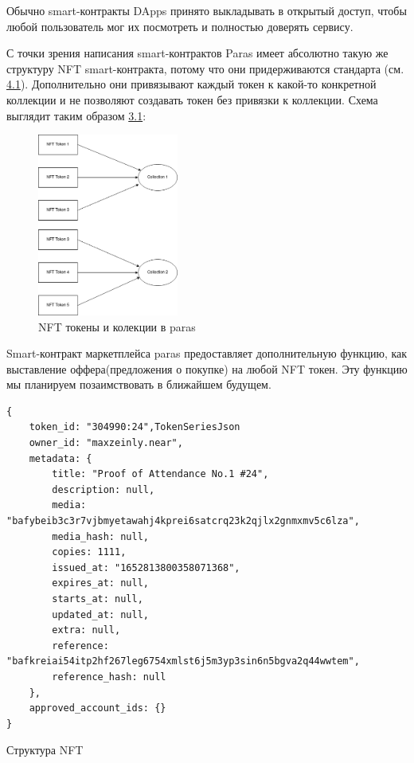 \begin{remark}
    Обычно smart-контракты DApps принято выкладывать в открытый доступ, чтобы любой пользователь мог их посмотреть и полностью доверять сервису.
\end{remark}

С точки зрения написания smart-контрактов Paras имеет абсолютно такую же структуру NFT smart-контракта, потому что они придерживаются стандарта \cite{nftstandart}(см. \hyperref[section.4.1]{\color{blue} 4.1}).
Дополнительно они привязывают каждый токен к какой-то конкретной коллекции и не позволяют создавать токен без привязки к коллекции.
Схема выглядит таким образом \hyperref[img.parascollections]{\color{blue} 3.1}:

\begin{figure}[H]
	\centering
	\includegraphics[height=60mm]{fig/parascollections.png}
	\caption{NFT токены и колекции в paras}
    \label{img.parascollections}
\end{figure}

Smart-контракт маркетплейса paras предоставляет дополнительную функцию, как выставление оффера(предложения о покупке) на любой NFT токен. Эту функцию мы планируем позаимствовать в ближайшем будущем.

\begin{listing}
\begin{verbatim}
{
    token_id: "304990:24",TokenSeriesJson
    owner_id: "maxzeinly.near",
    metadata: {
        title: "Proof of Attendance No.1 #24",
        description: null,
        media: "bafybeib3c3r7vjbmyetawahj4kprei6satcrq23k2qjlx2gnmxmv5c6lza",
        media_hash: null,
        copies: 1111,
        issued_at: "1652813800358071368",
        expires_at: null,
        starts_at: null,
        updated_at: null,
        extra: null,
        reference: "bafkreiai54itp2hf267leg6754xmlst6j5m3yp3sin6n5bgva2q44wwtem",
        reference_hash: null
    },
    approved_account_ids: {}
}
\end{verbatim}
\caption{Структура NFT}
\end{listing}

